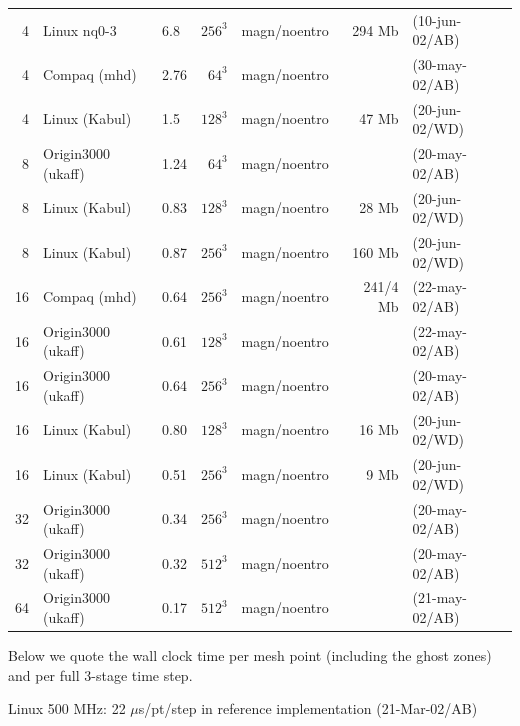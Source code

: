 \documentclass[12pt,twoside,notitlepage,a4paper]{article}
\begin{document}
\begin{table}[htb]
\begin{center}
\begin{small}
\begin{tabular}{rllrlrl}
 4    & Linux nq0-3       & 6.8  & $256^3$ & magn/noentro & 294 Mb & (10-jun-02/AB)\\
 4    & Compaq (mhd)      & 2.76 &  $64^3$ & magn/noentro &        & (30-may-02/AB)\\
 4    & Linux (Kabul)     & 1.5  & $128^3$ & magn/noentro &  47 Mb & (20-jun-02/WD)\\
 8    & Origin3000 (ukaff)& 1.24 &  $64^3$ & magn/noentro &        & (20-may-02/AB)\\
 8    & Linux (Kabul)     & 0.83 & $128^3$ & magn/noentro &  28 Mb & (20-jun-02/WD)\\
 8    & Linux (Kabul)     & 0.87 & $256^3$ & magn/noentro & 160 Mb & (20-jun-02/WD)\\
16    & Compaq (mhd)      & 0.64 & $256^3$ & magn/noentro &241/4 Mb& (22-may-02/AB)\\
16    & Origin3000 (ukaff)& 0.61 & $128^3$ & magn/noentro &        & (22-may-02/AB)\\
16    & Origin3000 (ukaff)& 0.64 & $256^3$ & magn/noentro &        & (20-may-02/AB)\\
16    & Linux (Kabul)     & 0.80 & $128^3$ & magn/noentro &  16 Mb & (20-jun-02/WD)\\
16    & Linux (Kabul)     & 0.51 & $256^3$ & magn/noentro &   9 Mb & (20-jun-02/WD)\\
32    & Origin3000 (ukaff)& 0.34 & $256^3$ & magn/noentro &        & (20-may-02/AB)\\
32    & Origin3000 (ukaff)& 0.32 & $512^3$ & magn/noentro &        & (20-may-02/AB)\\
64    & Origin3000 (ukaff)& 0.17 & $512^3$ & magn/noentro &        & (21-may-02/AB)\\
      \end{tabular}
    \end{small}
  \end{center}
\end{table}

Below we quote the wall clock time per mesh point (including the ghost zones)
and per full 3-stage time step.

Linux 500 MHz: 22 $\mu$s/pt/step in reference implementation (21-Mar-02/AB)
\end{document}
